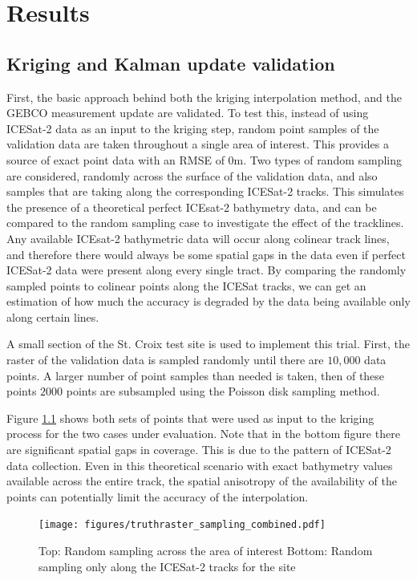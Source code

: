 
\chapter{Results}


\section{Kriging and Kalman update validation}

First, the basic approach behind both the kriging interpolation method, and the GEBCO measurement update are validated. To test this, instead of using ICESat-2 data as an input to the kriging step, random point samples of the validation data are taken throughout a single area of interest. This provides a source of exact point data with an RMSE of 0m. Two types of random sampling are considered, randomly across the surface of the validation data, and also samples that are taking along the corresponding ICESat-2 tracks. This simulates the presence of a theoretical perfect ICEsat-2 bathymetry data, and can be compared to the random sampling case to investigate the effect of the tracklines. Any available ICEsat-2 bathymetric data will occur along colinear track lines, and therefore there would always be some spatial gaps in the data even if perfect ICESat-2 data were present along every single tract. By comparing the randomly sampled points to colinear points along the ICESat tracks, we can get an estimation of how much the accuracy is degraded by the data being available only along certain lines. 

A small section of the St. Croix test site is used to implement this trial. First, the raster of the validation data is sampled randomly until there are $10,000$ data points. A larger number of point samples than needed is taken, then of these points $2000$ points are subsampled using the Poisson disk sampling method. 

Figure \ref{fig:truthras-sampling} shows both sets of points that were used as input to the kriging process for the two cases under evaluation. Note that in the bottom figure  there are significant spatial gaps in coverage. This is due to the pattern of ICESat-2 data collection. Even in this theoretical scenario with exact bathymetry values available across the entire track, the spatial anisotropy of the availability of the points can potentially limit the accuracy of the interpolation.

\begin{figure}[h]
    \centering
    \texttt{[image: figures/truthraster\_sampling\_combined.pdf]}
    \caption{Top: Random sampling across the area of interest \newline   Bottom: Random sampling only along the ICESat-2 tracks for the site}
    \label{fig:truthras-sampling}
\end{figure}

